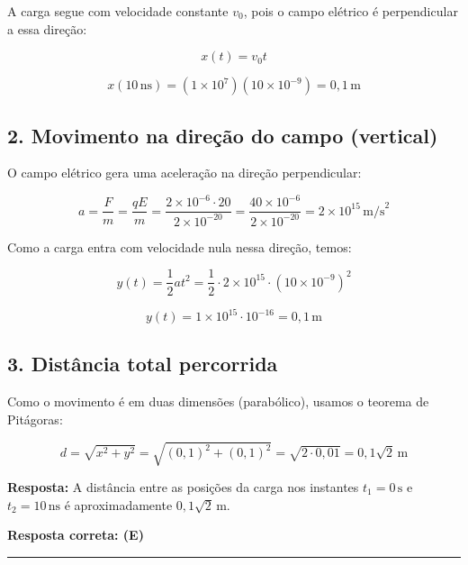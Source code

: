 \documentclass[a4paper,12pt]{article}
\begin{document}
\begin{flushleft}
A carga segue com velocidade constante \( v_0 \), pois o campo elétrico é perpendicular a essa direção:

\[
x(t) = v_0 t
\]

\[
x(10\, \text{ns}) = (1 \times 10^7)(10 \times 10^{-9}) = 0{,}1 \, \text{m}
\]

\subsection*{2. Movimento na direção do campo (vertical)}

O campo elétrico gera uma aceleração na direção perpendicular:

\[
a = \frac{F}{m} = \frac{qE}{m} = \frac{2 \times 10^{-6} \cdot 20}{2 \times 10^{-20}} = \frac{40 \times 10^{-6}}{2 \times 10^{-20}} = 2 \times 10^{15} \, \text{m/s}^2
\]

Como a carga entra com velocidade nula nessa direção, temos:

\[
y(t) = \frac{1}{2} a t^2 = \frac{1}{2} \cdot 2 \times 10^{15} \cdot (10 \times 10^{-9})^2
\]

\[
y(t) = 1 \times 10^{15} \cdot 10^{-16} = 0{,}1 \, \text{m}
\]

\subsection*{3. Distância total percorrida}

Como o movimento é em duas dimensões (parabólico), usamos o teorema de Pitágoras:

\[
d = \sqrt{x^2 + y^2} = \sqrt{(0{,}1)^2 + (0{,}1)^2} = \sqrt{2 \cdot 0{,}01} = 0{,}1\sqrt{2} \, \text{m}
\]

\textbf{Resposta:} A distância entre as posições da carga nos instantes \( t_1 = 0 \, \text{s} \) e \( t_2 = 10 \, \text{ns} \) 
é aproximadamente \( \boxed{ 0{,}1\sqrt{2} \, \text{m}} \).

\textbf{Resposta correta: \colorbox{green!50}{(E)}}

\end{flushleft}

\noindent\rule{\linewidth}{0.6pt}\\
\end{document}
